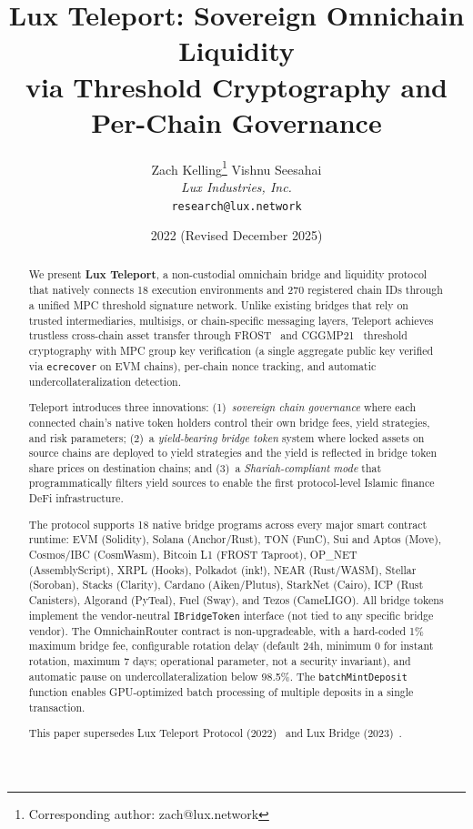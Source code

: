 \documentclass[11pt]{article}
\title{Lux Teleport: Sovereign Omnichain Liquidity\\via Threshold Cryptography and\\Per-Chain Governance}
\author{
Zach Kelling\thanks{Corresponding author: zach@lux.network}
\quad
Vishnu Seesahai\\
\textit{Lux Industries, Inc.}\\
\texttt{research@lux.network}
}
\date{2022 (Revised December 2025)}
\begin{document}
\luxcoverpage

\begin{abstract}
We present \textbf{Lux Teleport}, a non-custodial omnichain bridge and liquidity protocol that natively connects 18 execution environments and 270 registered chain IDs through a unified MPC threshold signature network. Unlike existing bridges that rely on trusted intermediaries, multisigs, or chain-specific messaging layers, Teleport achieves trustless cross-chain asset transfer through FROST~\cite{frost} and CGGMP21~\cite{cggmp21} threshold cryptography with MPC group key verification (a single aggregate public key verified via \texttt{ecrecover} on EVM chains), per-chain nonce tracking, and automatic undercollateralization detection.

Teleport introduces three innovations: (1)~\emph{sovereign chain governance} where each connected chain's native token holders control their own bridge fees, yield strategies, and risk parameters; (2)~a \emph{yield-bearing bridge token} system where locked assets on source chains are deployed to yield strategies and the yield is reflected in bridge token share prices on destination chains; and (3)~a \emph{Shariah-compliant mode} that programmatically filters yield sources to enable the first protocol-level Islamic finance DeFi infrastructure.

The protocol supports 18 native bridge programs across every major smart contract runtime: EVM (Solidity), Solana (Anchor/Rust), TON (FunC), Sui and Aptos (Move), Cosmos/IBC (CosmWasm), Bitcoin L1 (FROST Taproot), OP\_NET (AssemblyScript), XRPL (Hooks), Polkadot (ink!), NEAR (Rust/WASM), Stellar (Soroban), Stacks (Clarity), Cardano (Aiken/Plutus), StarkNet (Cairo), ICP (Rust Canisters), Algorand (PyTeal), Fuel (Sway), and Tezos (CameLIGO). All bridge tokens implement the vendor-neutral \texttt{IBridgeToken} interface (not tied to any specific bridge vendor). The OmnichainRouter contract is non-upgradeable, with a hard-coded 1\% maximum bridge fee, configurable rotation delay (default 24h, minimum 0 for instant rotation, maximum 7 days; operational parameter, not a security invariant), and automatic pause on undercollateralization below 98.5\%. The \texttt{batchMintDeposit} function enables GPU-optimized batch processing of multiple deposits in a single transaction.

This paper supersedes Lux Teleport Protocol (2022)~\cite{luxtp2022} and Lux Bridge (2023)~\cite{luxbridge2023}.
\end{abstract}
\end{document}
